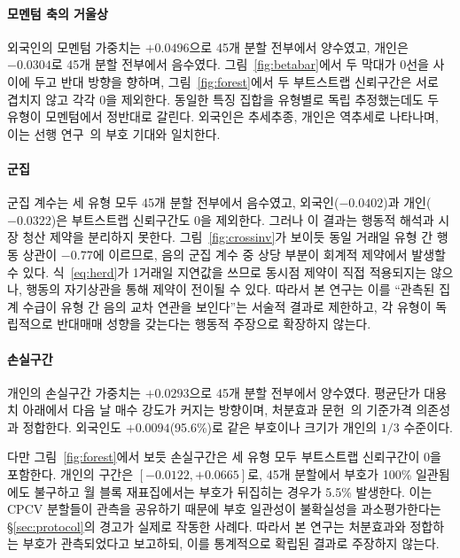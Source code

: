 \paragraph{모멘텀 축의 거울상}
외국인의 모멘텀 가중치는 $+0.0496$으로 45개 분할 전부에서 양수였고, 개인은
$-0.0304$로 45개 분할 전부에서 음수였다. 그림~\ref{fig:betabar}에서 두 막대가
0선을 사이에 두고 반대 방향을 향하며, 그림~\ref{fig:forest}에서 두 부트스트랩
신뢰구간은 서로 겹치지 않고 각각 0을 제외한다. 동일한 특징 집합을 유형별로 독립
추정했는데도 두 유형이 모멘텀에서 정반대로 갈린다. 외국인은 추세추종, 개인은
역추세로 나타나며, 이는 선행 연구~\cite{grinblatt2000investment,choe1999foreign}의
부호 기대와 일치한다.

\paragraph{군집}
군집 계수는 세 유형 모두 45개 분할 전부에서 음수였고, 외국인($-0.0402$)과
개인($-0.0322$)은 부트스트랩 신뢰구간도 0을 제외한다. 그러나 이 결과는 행동적
해석과 시장 청산 제약을 분리하지 못한다. 그림~\ref{fig:crossinv}가 보이듯 동일
거래일 유형 간 행동 상관이 $-0.77$에 이르므로, 음의 군집 계수 중 상당 부분이
회계적 제약에서 발생할 수 있다. 식~\eqref{eq:herd}가 1거래일 지연값을 쓰므로
동시점 제약이 직접 적용되지는 않으나, 행동의 자기상관을 통해 제약이 전이될 수
있다. 따라서 본 연구는 이를 ``관측된 집계 수급이 유형 간 음의 교차 연관을
보인다''는 서술적 결과로 제한하고, 각 유형이 독립적으로 반대매매 성향을 갖는다는
행동적 주장으로 확장하지 않는다.

\paragraph{손실구간}
개인의 손실구간 가중치는 $+0.0293$으로 45개 분할 전부에서 양수였다. 평균단가
대용치 아래에서 다음 날 매수 강도가 커지는 방향이며, 처분효과
문헌~\cite{shefrin1985disposition,odean1998investors}의 기준가격 의존성과
정합한다. 외국인도 $+0.0094$(95.6\%)로 같은 부호이나 크기가 개인의 $1/3$
수준이다.

다만 그림~\ref{fig:forest}에서 보듯 손실구간은 세 유형 모두 부트스트랩 신뢰구간이
0을 포함한다. 개인의 구간은 $[-0.0122,+0.0665]$로, 45개 분할에서 부호가 100\%
일관됨에도 불구하고 월 블록 재표집에서는 부호가 뒤집히는 경우가 5.5\% 발생한다.
이는 CPCV 분할들이 관측을 공유하기 때문에 부호 일관성이 불확실성을 과소평가한다는
\S\ref{sec:protocol}의 경고가 실제로 작동한 사례다. 따라서 본 연구는 처분효과와
정합하는 부호가 관측되었다고 보고하되, 이를 통계적으로 확립된 결과로 주장하지
않는다.

